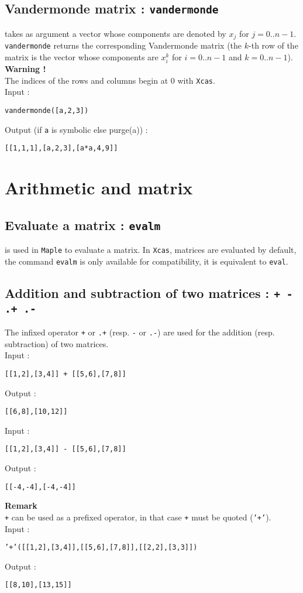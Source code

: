\documentclass[a4paper,11pt]{book}
\begin{document}
\subsection{Vandermonde matrix : {\tt vandermonde}}
 takes as argument a vector  whose  components are
denoted by $x_j$ for $j=0..n-1$.\\
{\tt vandermonde} returns the corresponding Vandermonde matrix
(the $k$-th row of the matrix is the vector whose components are
$x_i^{k}$ for $i=0..n-1$ and $k=0..n-1$).\\
{\bf Warning !}\\ 
The indices of the rows and columns begin at 0 with {\tt Xcas}.\\
Input :
\begin{center}{\tt vandermonde([a,2,3])}\end{center}
Output (if {\tt a} is symbolic else purge(a)) :
\begin{center}{\tt  [[1,1,1],[a,2,3],[a*a,4,9]]}\end{center}

\section{Arithmetic and matrix}
\subsection{Evaluate a matrix : {\tt evalm}}
 is used in {\tt Maple} to evaluate a matrix.  
In {\tt Xcas}, matrices are evaluated by default, the command 
{\tt evalm} is only available for compatibility, it is equivalent
to {\tt eval}.

\subsection{Addition and subtraction of two matrices : {\tt + - .+ .-}}\index{+}\index{-}  
\noindent The infixed operator {\tt +} or {\tt .+} (resp. {\tt -} or {\tt .-})
are used for the  addition (resp. subtraction) of two matrices.\\
Input :
\begin{center}{\tt [[1,2],[3,4]] + [[5,6],[7,8]]}\end{center}
Output :
\begin{center}{\tt [[6,8],[10,12]]}\end{center}
Input :
\begin{center}{\tt [[1,2],[3,4]] - [[5,6],[7,8]]}\end{center}
Output :
\begin{center}{\tt [[-4,-4],[-4,-4]]}\end{center}
{\bf Remark}\\
{\tt +} can be used as a prefixed operator, in that case 
{\tt +} must be quoted ({\tt '+'}).\\
Input :
\begin{center}{\tt '+'([[1,2],[3,4]],[[5,6],[7,8]],[[2,2],[3,3]])}\end{center}
Output :
\begin{center}{\tt [[8,10],[13,15]]}\end{center}
\end{document}
